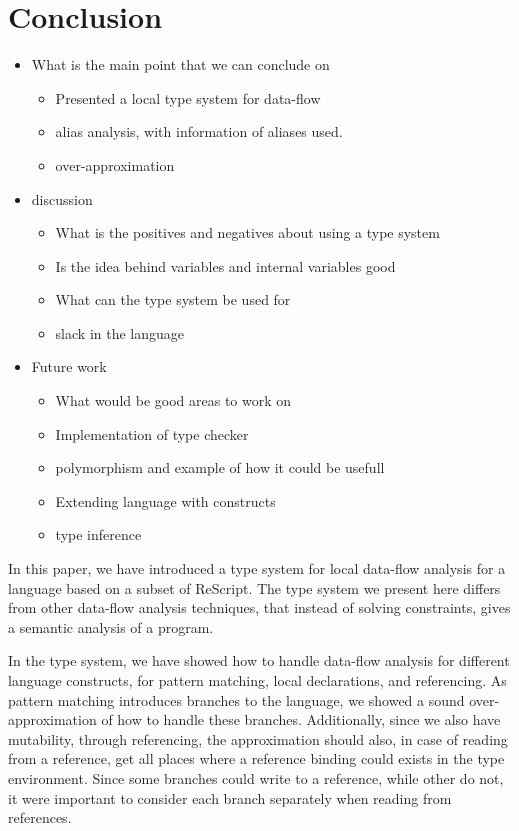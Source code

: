 \documentclass[../../master.tex]{subfiles}
\begin{document}
\section{Conclusion}\label{sec:Conc}
\begin{itemize}
	\item What is the main point that we can conclude on
	\begin{itemize}
		\item Presented a local type system for data-flow
		\item alias analysis, with information of aliases used.
		\item over-approximation
	\end{itemize}
	\item discussion
	\begin{itemize}
		\item What is the positives and negatives about using a type system
		\item Is the idea behind variables and internal variables good
		\item What can the type system be used for
		\item slack in the language
	\end{itemize}
	\item Future work
	\begin{itemize}
		\item What would be good areas to work on
		\item Implementation of type checker
		\item polymorphism and example of how it could be usefull
		\item Extending language with constructs
		\item type inference
	\end{itemize}
\end{itemize}
In this paper, we have introduced a type system for local data-flow analysis for a language based on a subset of ReScript.
The type system we present here differs from other data-flow analysis techniques, that instead of solving constraints, gives a semantic analysis of a program.

In the type system, we have showed how to handle data-flow analysis for different language constructs, for pattern matching, local declarations, and referencing.
As pattern matching introduces branches to the language, we showed a sound over-approximation of how to handle these branches.
Additionally, since we also have mutability, through referencing, the approximation should also, in case of reading from a reference, get all places where a reference binding could exists in the type environment.
Since some branches could write to a reference, while other do not, it were important to consider each branch separately when reading from references.
\end{document}
